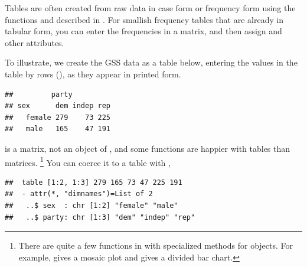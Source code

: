 \documentclass[11pt]{book}
\renewenvironment{knitrout}{\small\renewcommand{\baselinestretch}{.85}}{} %
\begin{document}
Tables are often created from raw data in case form or frequency form using the
functions  and  described in .
For smallish frequency tables that are already in tabular form, you can enter
the frequencies in a matrix, and then assign  and other attributes.

To illustrate, we create the GSS data as a table below, entering the
values in the table by rows (), as they appear in
printed form.

\begin{knitrout}
\color{fgcolor}\begin{kframe}
\begin{alltt}
 \hlkwb{<-} \hlstd{(}\hlstd{(}\hlstd{,} \hlstd{,} \hlstd{,}
                    \hlstd{,} \hlstd{,} \hlstd{),} \hlstd{=}\hlstd{,} \hlstd{=}\hlstd{,} \hlstd{=}\hlstd{)}
 \hlkwb{<-} \hlstd{(}\hlstd{=}\hlstd{(}\hlstd{,} \hlstd{),}
                          \hlstd{=}\hlstd{(}\hlstd{,} \hlstd{,} \hlstd{))}
\end{alltt}
\begin{verbatim}
##         party
## sex      dem indep rep
##   female 279    73 225
##   male   165    47 191
\end{verbatim}
\end{kframe}
\end{knitrout}
 is a matrix, not an object of , and some functions
are happier with tables than matrices.%
\footnote{
There are quite a few functions in \R with specialized methods for
 objects. For example,  gives a mosaic
plot and  gives a divided bar chart.
}
You can coerce it to a table with ,
\begin{knitrout}
\color{fgcolor}\begin{kframe}
\begin{alltt}
 \hlkwb{<-} 
\end{alltt}
\begin{verbatim}
##  table [1:2, 1:3] 279 165 73 47 225 191
##  - attr(*, "dimnames")=List of 2
##   ..$ sex  : chr [1:2] "female" "male"
##   ..$ party: chr [1:3] "dem" "indep" "rep"
\end{verbatim}
\end{kframe}
\end{knitrout}
\end{document}
